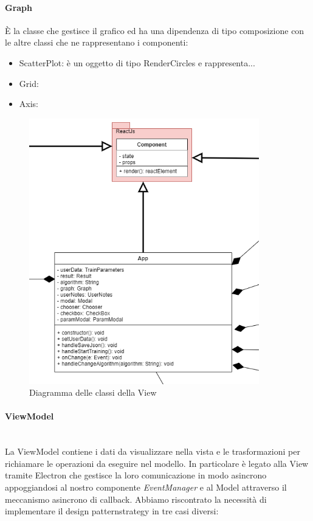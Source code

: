 		\paragraph*{Graph}
		È la classe che gestisce il grafico ed ha una dipendenza di tipo composizione con le altre classi che ne rappresentano i componenti:
		\begin{itemize}
			\item ScatterPlot: è un oggetto di tipo RenderCircles e rappresenta...
			\item Grid:
			\item Axis: 
		\end{itemize}
		\mbox{}
				\begin{figure} [H]
					\begin{center}
						\includegraphics[width=100mm]{img/Diagrammi/view-app.png}
					\end{center}
					\caption{Diagramma delle classi della View}
				\end{figure}
	
		\paragraph{ViewModel} \mbox{} \\[1mm]
		La ViewModel contiene i dati da visualizzare nella vista e le trasformazioni per richiamare le operazioni da eseguire nel modello.
		In particolare è legato alla View tramite Electron che gestisce la loro comunicazione in modo asincrono appoggiandosi al nostro componente \textit{EventManager} e al Model attraverso il meccanismo asincrono di callback.
		Abbiamo riscontrato la necessità di implementare il design pattern\glosp strategy in tre casi diversi:
